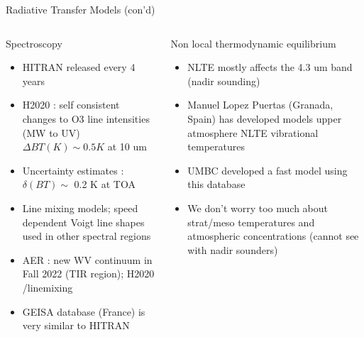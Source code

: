 \documentclass[10pt,t]{beamer}
\begin{document}
\begin{frame}[shrink=2]{Radiative Transfer Models (con'd)}
\vspace{-0.1in}
\begin{columns}

\begin{column}{0.55\columnwidth}
\begin{block}{Spectroscopy}
  \begin{itemize}
  \item HITRAN released every 4 years
  \item H2020 : self consistent changes to O3 line intensities (MW to UV) $\Delta BT(K) \sim 0.5K$ at 10 um
  \item Uncertainty estimates : $\delta(BT) \sim$ 0.2 K at TOA  
  \item Line mixing models; speed dependent Voigt line shapes used in other spectral regions
  \item AER : new WV continuum in Fall 2022 (TIR region); H2020 \cd/\methane linemixing
  \item GEISA database (France) is very similar to HITRAN

  \end{itemize}
\end{block}
\end{column}

\begin{column}{0.55\columnwidth}
\begin{block}{Non local thermodynamic equilibrium}
  \begin{itemize}
  \item NLTE mostly affects the 4.3 um \cd band (nadir sounding)
  \item Manuel Lopez Puertas (Granada, Spain) has developed models upper atmosphere NLTE vibrational temperatures
  \item UMBC developed a fast model using this database
  \item We don't worry too much about strat/meso temperatures and atmospheric concentrations (cannot see with nadir sounders)
  \end{itemize}
\end{block}
\end{column}
\end{columns}
\end{frame}
\end{document}

